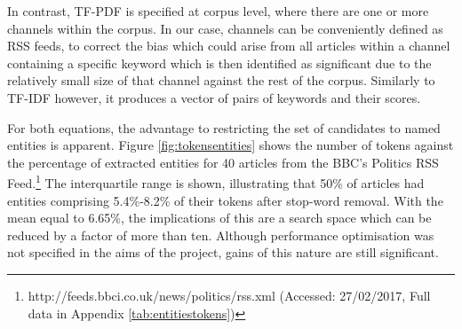 In contrast, TF-PDF is specified at corpus level, where there are one or more channels within the corpus. In our case, channels can be conveniently defined as RSS feeds, to correct the bias which could arise from all articles within a channel containing a specific keyword which is then identified as significant due to the relatively small size of that channel against the rest of the corpus. Similarly to TF-IDF however, it produces a vector of pairs of keywords and their scores.

%

For both equations, the advantage to restricting the set of candidates to named entities is apparent. Figure \ref{fig:tokensentities} shows the number of tokens against the percentage of extracted entities for 40 articles from the BBC's Politics RSS Feed.\footnote{http://feeds.bbci.co.uk/news/politics/rss.xml (Accessed: 27/02/2017, Full data in Appendix \ref{tab:entitiestokens})} The interquartile range is shown, illustrating that 50\% of articles had entities comprising 5.4\%-8.2\% of their tokens after stop-word removal. With the mean equal to 6.65\%, the implications of this are a search space which can be reduced by a factor of more than ten. Although performance optimisation was not specified in the aims of the project, gains of this nature are still significant.

